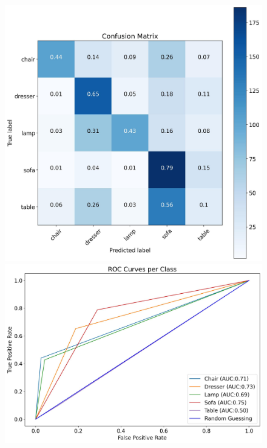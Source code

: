 \documentclass[11pt,a4paper]{article}
\begin{document}
\begin{figure}[H]
{{    \includegraphics[scale=0.13]{imgs/experiments/images/7/Experiment-7-TESTING-confusion-matrix.jpg}
    \includegraphics[scale=0.13]{imgs/experiments/images/7/Experiment-7-TESTING-ROC.jpg}
    }}
    \qquad
\end{figure}
\end{document}

